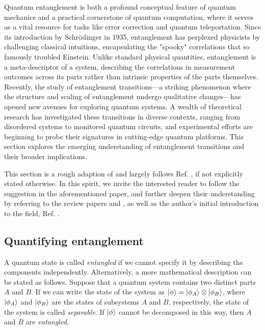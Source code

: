 Quantum entanglement is both a profound conceptual feature of quantum mechanics
and a practical cornerstone of quantum computation, where it serves as a vital
resource for tasks like error correction and quantum teleportation. Since its
introduction by Schrödinger in 1935, entanglement has perplexed physicists by
challenging classical intuitions, encapsulating the "spooky" correlations that
so famously troubled Einstein. Unlike standard physical quantities,
entanglement is a meta-descriptor of a system, describing the correlations in
measurement outcomes across its parts rather than intrinsic properties of the
parts themselves. Recently, the study of entanglement transitions—a striking
phenomenon where the structure and scaling of entanglement undergo qualitative
changes—has opened new avenues for exploring quantum systems. A wealth of
theoretical research has investigated these transitions in diverse contexts,
ranging from disordered systems to monitored quantum circuits, and experimental
efforts are beginning to probe their signatures in cutting-edge quantum
platforms. This section explores the emerging understanding of entanglement
transitions and their broader implications.

This section is a rough adaption of and largely follows Ref.
\cite{skinnerLectureNotesIntroduction2023}, if not explicitly stated otherwise.
In this spirit, we invite the interested reader to follow the suggestion in the
aforementioned paper, and further deepen their understanding by referring to the
review papers
\cite{fisherRandomQuantumCircuits2023} and \cite{potterEntanglementDynamicsHybrid2021}, as
well as the author's initial introduction to the field, Ref.
\cite{liMeasurementdrivenEntanglementTransition2019}.

\subsection{Quantifying entanglement}

A quantum state is called \emph{entangled} if we cannot specify it by
describing the components independently. Alternatively, a more mathematical description can
be stated as follows. Suppose that a quantum system contains two distinct parts
$A$ and $B$. If we can write the state of the system as $\ket{\phi} =
\ket{\phi_A} \otimes \ket{\phi_B}$, where $\ket{\phi_A}$ and $\ket{\phi_B}$ are
the states of subsystems $A$ and $B$, respectively, the state of the system is
called \emph{separable}. If $\ket{\phi}$ cannot be decomposed in this way, then
$A$ and $B$ are \emph{entangled}.

